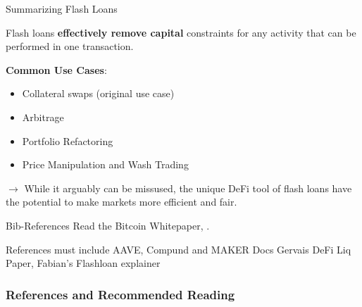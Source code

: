 \documentclass[handout]{beamer}
\begin{document}
\begin{frame}{Summarizing Flash Loans}

Flash loans \textbf{effectively remove capital} constraints for any activity that can be performed in one transaction.

\vspace{1em}

\textbf{Common Use Cases}:

\begin{itemize}
\item Collateral swaps (original use case)
\item Arbitrage
\item Portfolio Refactoring
\item Price Manipulation and Wash Trading

\end{itemize}

\vspace{2em}

$\rightarrow$ While it arguably can be missused, the unique DeFi tool of flash loans have the potential to make markets more efficient and fair.


	
\end{frame}


\begin{frame}{Bib-References}
		Read the Bitcoin Whitepaper, \cite{nakamotoBitcoin2008}.
\end{frame}

\begin{frame}%

References must include AAVE, Compund and MAKER Docs
Gervais DeFi Liq Paper, Fabian's Flashloan explainer

\frametitle{References and Recommended Reading}
	
	
\end{frame}
\end{document}
